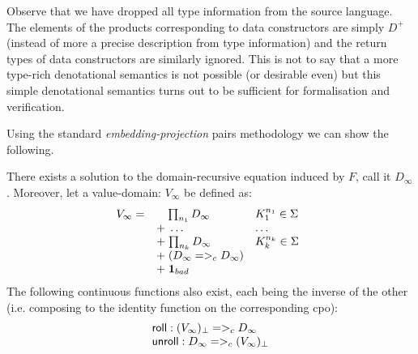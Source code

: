 Observe that we have dropped all type information from the source language. The elements of the products 
corresponding to data constructors are simply $D^{+}$ (instead of more a precise description from type 
information) and the return types of data constructors are similarly ignored. This is not to say that 
a more type-rich denotational semantics is not possible (or desirable even) but this simple denotational 
semantics turns out to be sufficient for formalisation and verification. 


Using the standard {\em embedding-projection} pairs methodology we can show the following.
\begin{lemma}\label{lem:rec-solution} 
There exists a solution to the domain-recursive equation induced by $F$, call it $D_{\infty}$.
Moreover, let a value-domain: $V_{\infty}$ be defined as:
    \[V_{\infty} = \begin{array}[t]{ll}
             \quad\;{\prod_{n_1}{D_{\infty}}} & K_1^{n_1} \in \Sigma \\
             \; + \;\ldots                    & \ldots \\
             \; + \;{\prod_{n_k}{D_{\infty}}} & K_k^{n_k} \in \Sigma \\ 
             \; + \;(D_{\infty} =>_c D_{\infty}) \\
             \; + \;{\sf{\bf 1}}_{bad} \quad
    \end{array}\]
The following continuous functions also exist, each being the inverse of the 
other (i.e. composing to the identity function on the corresponding cpo):
\[\begin{array}{l}
  \mathsf{roll} : (V_{\infty})_\bot =>_c D_{\infty} \\ 
  \mathsf{unroll} : D_{\infty} =>_c (V_{\infty})_\bot
\end{array}\] 
\end{lemma}

